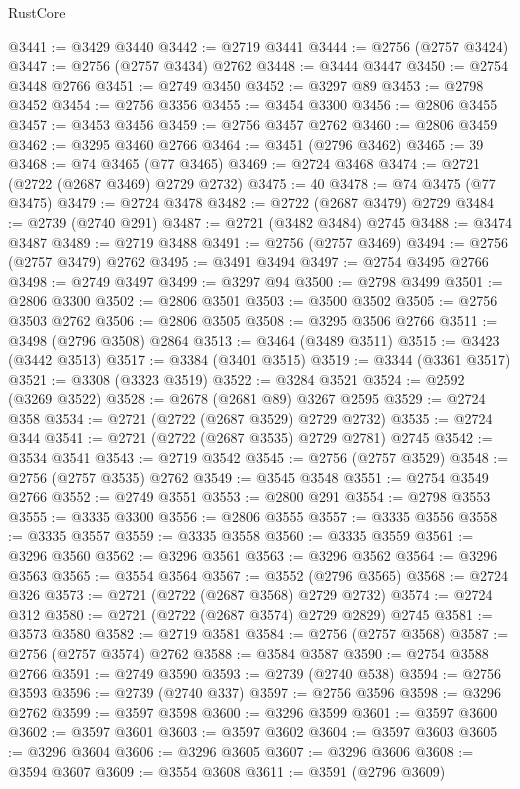 \begin{lexlean}{RustCore}
\begin{coremodule}
@3441 := @3429 @3440
@3442 := @2719 @3441
@3444 := @2756 (@2757 @3424)
@3447 := @2756 (@2757 @3434) @2762
@3448 := @3444 @3447
@3450 := @2754 @3448 @2766
@3451 := @2749 @3450
@3452 := @3297 @89
@3453 := @2798 @3452
@3454 := @2756 @3356
@3455 := @3454 @3300
@3456 := @2806 @3455
@3457 := @3453 @3456
@3459 := @2756 @3457 @2762
@3460 := @2806 @3459
@3462 := @3295 @3460 @2766
@3464 := @3451 (@2796 @3462)
@3465 := 39
@3468 := @74 @3465 (@77 @3465)
@3469 := @2724 @3468
@3474 := @2721 (@2722 (@2687 @3469) @2729 @2732)
@3475 := 40
@3478 := @74 @3475 (@77 @3475)
@3479 := @2724 @3478
@3482 := @2722 (@2687 @3479) @2729
@3484 := @2739 (@2740 @291)
@3487 := @2721 (@3482 @3484) @2745
@3488 := @3474 @3487
@3489 := @2719 @3488
@3491 := @2756 (@2757 @3469)
@3494 := @2756 (@2757 @3479) @2762
@3495 := @3491 @3494
@3497 := @2754 @3495 @2766
@3498 := @2749 @3497
@3499 := @3297 @94
@3500 := @2798 @3499
@3501 := @2806 @3300
@3502 := @2806 @3501
@3503 := @3500 @3502
@3505 := @2756 @3503 @2762
@3506 := @2806 @3505
@3508 := @3295 @3506 @2766
@3511 := @3498 (@2796 @3508) @2864
@3513 := @3464 (@3489 @3511)
@3515 := @3423 (@3442 @3513)
@3517 := @3384 (@3401 @3515)
@3519 := @3344 (@3361 @3517)
@3521 := @3308 (@3323 @3519)
@3522 := @3284 @3521
@3524 := @2592 (@3269 @3522)
@3528 := @2678 (@2681 @89) @3267 @2595
@3529 := @2724 @358
@3534 := @2721 (@2722 (@2687 @3529) @2729 @2732)
@3535 := @2724 @344
@3541 := @2721 (@2722 (@2687 @3535) @2729 @2781) @2745
@3542 := @3534 @3541
@3543 := @2719 @3542
@3545 := @2756 (@2757 @3529)
@3548 := @2756 (@2757 @3535) @2762
@3549 := @3545 @3548
@3551 := @2754 @3549 @2766
@3552 := @2749 @3551
@3553 := @2800 @291
@3554 := @2798 @3553
@3555 := @3335 @3300
@3556 := @2806 @3555
@3557 := @3335 @3556
@3558 := @3335 @3557
@3559 := @3335 @3558
@3560 := @3335 @3559
@3561 := @3296 @3560
@3562 := @3296 @3561
@3563 := @3296 @3562
@3564 := @3296 @3563
@3565 := @3554 @3564
@3567 := @3552 (@2796 @3565)
@3568 := @2724 @326
@3573 := @2721 (@2722 (@2687 @3568) @2729 @2732)
@3574 := @2724 @312
@3580 := @2721 (@2722 (@2687 @3574) @2729 @2829) @2745
@3581 := @3573 @3580
@3582 := @2719 @3581
@3584 := @2756 (@2757 @3568)
@3587 := @2756 (@2757 @3574) @2762
@3588 := @3584 @3587
@3590 := @2754 @3588 @2766
@3591 := @2749 @3590
@3593 := @2739 (@2740 @538)
@3594 := @2756 @3593
@3596 := @2739 (@2740 @337)
@3597 := @2756 @3596
@3598 := @3296 @2762
@3599 := @3597 @3598
@3600 := @3296 @3599
@3601 := @3597 @3600
@3602 := @3597 @3601
@3603 := @3597 @3602
@3604 := @3597 @3603
@3605 := @3296 @3604
@3606 := @3296 @3605
@3607 := @3296 @3606
@3608 := @3594 @3607
@3609 := @3554 @3608
@3611 := @3591 (@2796 @3609)

\end{coremodule}
\end{lexlean}
